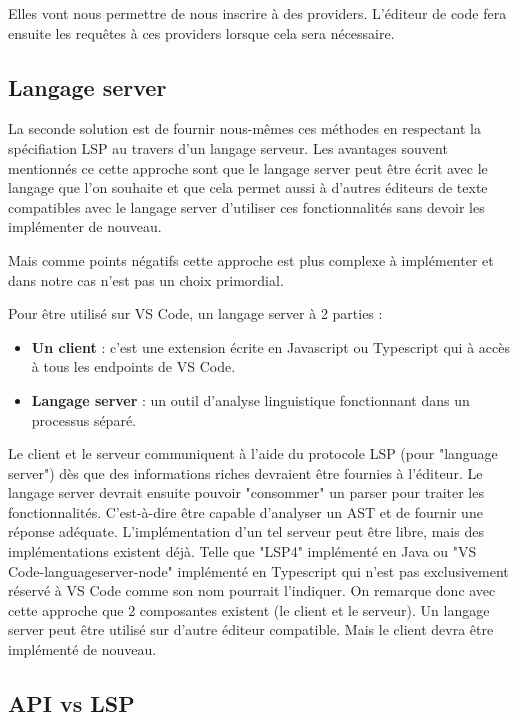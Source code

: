 \documentclass[
    iict, %
    il, %
]{heig-tb}
\begin{document}
Elles vont nous permettre de nous inscrire à des providers. L'éditeur de code fera ensuite les requêtes à ces providers lorsque cela sera nécessaire.

\subsection{Langage server}
La seconde solution est de fournir nous-mêmes ces méthodes en respectant la spécifiation LSP \cite{lsp-specification} au travers d'un langage serveur.
Les avantages souvent mentionnés ce cette approche sont que le langage server peut être écrit avec le langage que l'on souhaite et
que cela permet aussi à d'autres éditeurs de texte compatibles avec le langage server d'utiliser ces fonctionnalités sans devoir les implémenter de nouveau.

Mais comme points négatifs cette approche est plus complexe à implémenter et dans notre cas n'est pas un choix primordial.

Pour être utilisé sur VS Code, un langage server à 2 parties :
\begin{itemize}
    \item \textbf{Un client} : c'est une extension écrite en Javascript ou Typescript qui à accès à tous les endpoints de VS Code.
    \item \textbf{Langage server} : un outil d'analyse linguistique fonctionnant dans un processus séparé.
\end{itemize}

\vspace{\parskip}

Le client et le serveur communiquent à l'aide du protocole LSP (pour "language server") dès que des informations riches devraient être fournies à l'éditeur.
Le langage server devrait ensuite pouvoir "consommer" un parser pour traiter les fonctionnalités. C'est-à-dire être capable d'analyser un AST et de fournir une réponse adéquate.
L'implémentation d'un tel serveur peut être libre, mais des implémentations existent déjà. Telle que "LSP4" implémenté en Java ou  "VS Code-languageserver-node" implémenté en Typescript qui n'est pas exclusivement réservé à VS Code comme son nom pourrait l'indiquer.
On remarque donc avec cette approche que 2 composantes existent (le client et le serveur).
Un langage server peut être utilisé sur d'autre éditeur compatible. Mais le client devra être implémenté de nouveau.

\subsection{API vs LSP}\label{api vs lsp}
\end{document}
